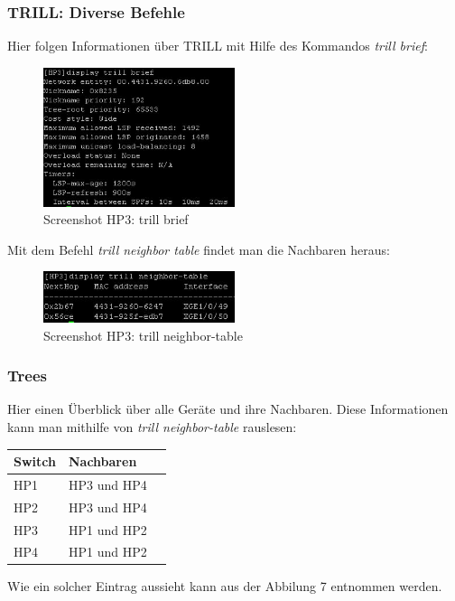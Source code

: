 \documentclass[a4,12pt]{scrartcl}
\begin{document}
\subsubsection{TRILL: Diverse Befehle}
Hier folgen Informationen über TRILL mit Hilfe des Kommandos \textit{trill brief}:
\begin{figure} [H]
	\begin{center}
	\includegraphics[width=0.50\textwidth]{./pictures/brief.jpg}
	\caption{Screenshot HP3: trill brief}
	\label{x}
	\end{center}
\end{figure}

Mit dem Befehl \textit{trill neighbor table} findet man die Nachbaren heraus: 
\begin{figure} [H]
	\begin{center}
	\includegraphics[width=0.50\textwidth]{./pictures/neighbor-table.jpg}
	\caption{Screenshot HP3: trill neighbor-table}
	\label{x}
	\end{center}
\end{figure}

\subsubsection{Trees}
Hier einen Überblick über alle Geräte und ihre Nachbaren. Diese Informationen kann man mithilfe von \textit{trill neighbor-table} rauslesen: 
\begin{center}
    \begin{tabular}{@{} l l r@{}}\toprule    
    {Switch} & {Nachbaren}\\ \midrule
    HP1 & HP3 und HP4\\ \addlinespace
    HP2 & HP3 und HP4\\ \addlinespace
    HP3 & HP1 und HP2\\ \addlinespace
    HP4 & HP1 und HP2\\ 
    \bottomrule
    \end{tabular}
\end{center}
Wie ein solcher Eintrag aussieht kann aus der Abbilung 7 entnommen werden. 
\end{document}
